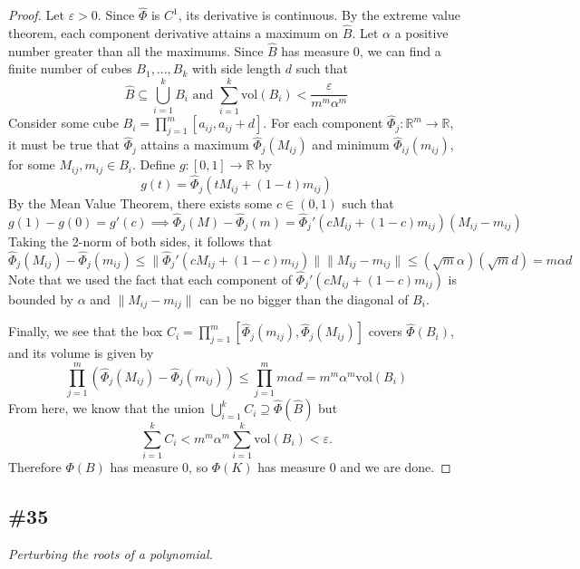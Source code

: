 \documentclass{article}
\newcommand{\vol}{\mathrm{vol}}
\theoremstyle{plain} %
\numberwithin{thm}{section} %
\theoremstyle{definition}
\begin{document}
\begin{proof}
            Let \(\varepsilon > 0\). Since \(\hat{\Phi}\) is \(C^1\), its derivative is continuous. By the extreme value theorem, each component derivative attains a maximum on \(\hat{B}\). Let \(\alpha\) a positive number greater than all the maximums. Since \(\hat{B}\) has measure 0, we can find a finite number of cubes \(B_1, ..., B_k\) with side length \(d\) such that
            \[
                \hat{B} \subseteq \bigcup_{i=1}^{k} B_i \text{ and } \sum_{i=1}^{k} \vol(B_i) < \frac{\varepsilon}{m^m \alpha^m}
            \]
            Consider some cube \(B_i = \prod_{j=1}^{m} [a_{ij}, a_{ij} + d]\). For each component \(\hat{\Phi}_j: \mathbb{R}^m \to \mathbb{R}\), it must be true that \(\hat{\Phi}_j\) attains a maximum \(\hat{\Phi}_j(M_{ij})\) and minimum \(\hat{\Phi}_{ij}(m_{ij})\), for some \(M_{ij}, m_{ij} \in B_i\). Define \(g: [0,1] \to \mathbb{R}\) by
            \[
                g(t) = \hat{\Phi}_j(t M_{ij} + (1 - t)m_{ij})
            \]
            By the Mean Value Theorem, there exists some \(c \in (0,1)\) such that
            \[
                g(1) - g(0) = g'(c) \implies \hat{\Phi}_j (M) - \hat{\Phi}_j (m) = \hat{\Phi}_j '(c M_{ij} + (1 - c)m_{ij})(M_{ij} - m_{ij})
            \]
            Taking the 2-norm of both sides, it follows that
            \[
                \hat{\Phi}_j (M_{ij}) - \hat{\Phi}_j (m_{ij}) \leq \|\hat{\Phi}_j '(c M_{ij} + (1 - c)m_{ij})\| \|M_{ij} - m_{ij}\| \leq (\sqrt{m} \alpha)(\sqrt{m}d) = m \alpha d
            \]
            Note that we used the fact that each component of \(\hat{\Phi}_j '(c M_{ij} + (1 - c)m_{ij})\) is bounded by \(\alpha\) and \(\|M_{ij} - m_{ij}\|\) can be no bigger than the diagonal of \(B_i\).

            Finally, we see that the box \(C_i = \prod_{j=1}^m [\hat{\Phi}_j(m_{ij}), \hat{\Phi}_j(M_{ij})]\) covers \(\hat{\Phi} (B_i)\), and its volume is given by
            \[
                \prod_{j=1}^m (\hat{\Phi}_j (M_{ij}) - \hat{\Phi}_j (m_{ij})) \leq \prod_{j=1}^m m \alpha d = m^m \alpha^m \vol (B_i)
            \]
            From here, we know that the union \(\bigcup_{i=1}^{k} C_i \supseteq \hat{\Phi}(\hat{B})\) but
            \[
                \sum_{i=1}^{k} C_i < m^m \alpha^m \sum_{i=1}^{k} \vol (B_i) < \varepsilon.
            \]
            Therefore \(\Phi(B)\) has measure 0, so \(\Phi (K)\) has measure 0 and we are done.
        \end{proof}
        \newpage
        \subsection{\#35}
        \textit{Perturbing the roots of a polynomial.}
    
\end{document}
